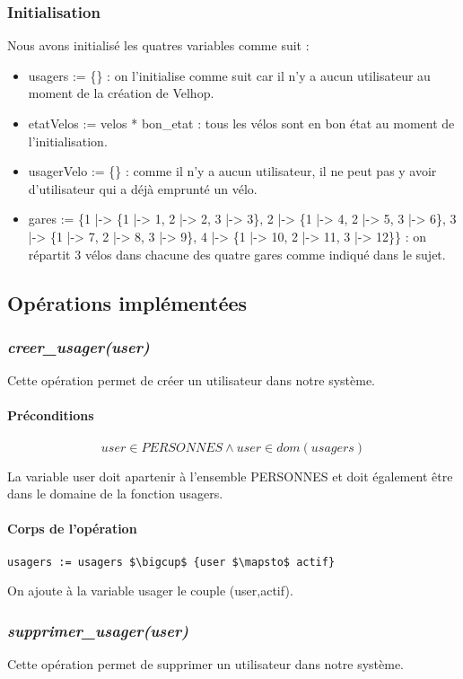\documentclass[12pt]{article}
\begin{document}
\subsubsection{Initialisation}
Nous avons initialisé les quatres variables comme suit :
\begin{itemize}
  \item usagers := \{\} : on l'initialise comme suit car il n'y a aucun utilisateur au moment de la création de Velhop.
  \item etatVelos := velos * {bon\_etat} : tous les vélos sont en bon état au moment de l'initialisation.
  \item usagerVelo := \{\} : comme il n'y a aucun utilisateur, il ne peut pas y avoir d'utilisateur qui a déjà emprunté un vélo.
  \item gares := \{1 |-> \{1 |-> 1, 2 |-> 2, 3 |-> 3\}, 2 |-> \{1 |-> 4, 2 |-> 5, 3 |-> 6\}, 3 |-> \{1 |-> 7, 2 |-> 8, 3 |-> 9\}, 4 |-> \{1 |-> 10, 2 |-> 11, 3 |-> 12\}\} : on répartit 3 vélos dans chacune des quatre gares comme indiqué dans le sujet.
\end{itemize}
\subsection{Opérations implémentées}
\subsubsection{\textit{creer\_usager(user)}}
Cette opération permet de créer un utilisateur dans notre système.
\paragraph{Préconditions}
\[user \in PERSONNES \land user \in dom(usagers)\]

La variable user doit apartenir à l'ensemble PERSONNES et doit également être dans le domaine de la fonction usagers.
\paragraph{Corps de l'opération}
\textbf{}
\begin{lstlisting}[mathescape]
  usagers := usagers $\bigcup$ {user $\mapsto$ actif}
\end{lstlisting}

On ajoute à la variable usager le couple (user,actif).
\subsubsection{\textit{supprimer\_usager(user)}}
Cette opération permet de supprimer un utilisateur dans notre système.
\end{document}
